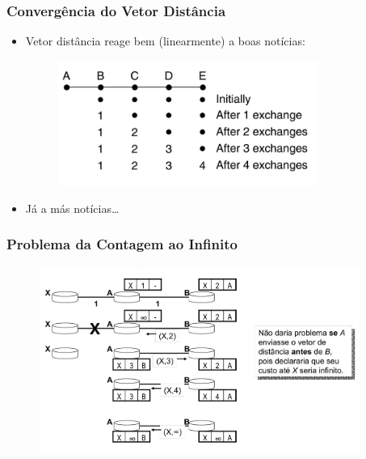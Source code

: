 \documentclass{beamer}
\begin{document}
\begin{frame}
\frametitle{Convergência do Vetor Distância}

\begin{itemize}
  \item Vetor distância reage bem (linearmente) a boas notícias:
\begin{figure}[htp]
\begin{center}
  \includegraphics[width=85mm]{Imagens/ConvergenciaVetorDistancia.jpeg}
  \label{convergencia_vetor_distancia}
\end{center}
\end{figure}
   \item Já a más notícias\ldots
\end{itemize}
\end{frame}

\begin{frame}
\frametitle{Problema da Contagem ao Infinito}
\begin{figure}[htp]
\begin{center}
  \includegraphics[width=105mm]{Imagens/ContagemAoInfinito.jpeg}
  \label{contagem_ao_infinito}
\end{center}
\end{figure}
\end{frame}
\end{document}

